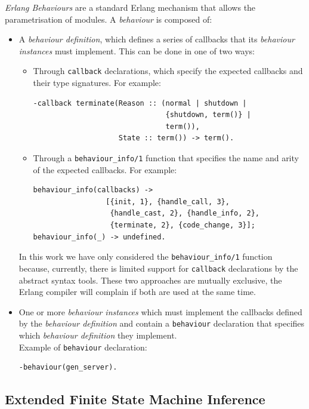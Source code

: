 \emph{Erlang Behaviours} are a standard Erlang mechanism that allows the
parametrisation of modules. A \emph{behaviour} is composed of:
\begin{itemize}
\item A \emph{behaviour definition}, which defines a series of callbacks
that its \emph{behaviour instances} must implement. This can be done
in one of two ways:

\begin{itemize}
\item Through \texttt{callback} declarations, which specify the expected
callbacks and their type signatures. For example:\begin{verbatim}
-callback terminate(Reason :: (normal | shutdown |
                               {shutdown, term()} |
                               term()),
                    State :: term()) -> term().
\end{verbatim}
\item Through a \texttt{behaviour\_info/1} function that specifies the name
and arity of the expected callbacks. For example:\begin{verbatim}
behaviour_info(callbacks) ->
                 [{init, 1}, {handle_call, 3},
                  {handle_cast, 2}, {handle_info, 2},
                  {terminate, 2}, {code_change, 3}];
behaviour_info(_) -> undefined.
\end{verbatim}
\end{itemize}

In this work we have only considered the \texttt{behaviour\_info/1}
function because, currently, there is limited support for \texttt{callback}
declarations by the abstract syntax tools. These two approaches are
mutually exclusive, the Erlang compiler will complain if both are
used at the same time.

\item One or more \emph{behaviour instances} which must implement the callbacks
defined by the \emph{behaviour definition} and contain a \texttt{behaviour}
declaration that specifies which \emph{behaviour definition} they
implement. \\
Example of \texttt{behaviour} declaration:\begin{verbatim}
-behaviour(gen_server).
\end{verbatim}
\end{itemize}

\subsection{Extended Finite State Machine Inference}

